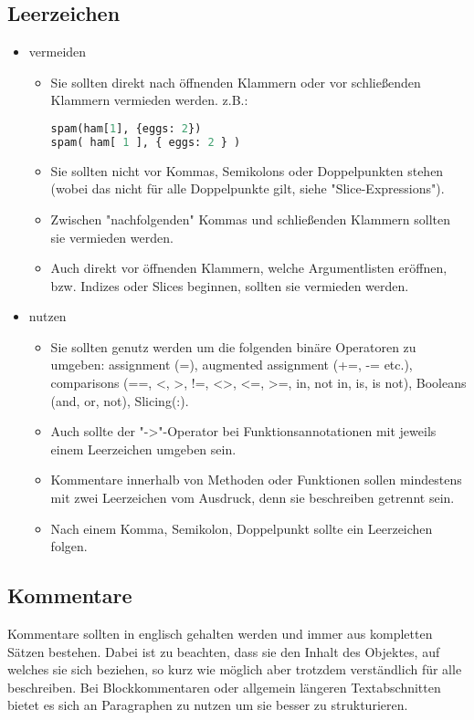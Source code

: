 \subsection{Leerzeichen}
\begin{itemize}
\item vermeiden
\begin{itemize}
\item Sie sollten direkt nach öffnenden Klammern oder vor schließenden Klammern vermieden werden.
z.B.: 
\begin{lstlisting}[language=python]
spam(ham[1], {eggs: 2})
spam( ham[ 1 ], { eggs: 2 } )
\end{lstlisting}
\item Sie sollten nicht vor Kommas, Semikolons oder Doppelpunkten stehen (wobei das nicht für alle Doppelpunkte gilt, siehe "Slice-Expressions").
\item Zwischen "nachfolgenden" Kommas und schließenden Klammern sollten sie vermieden werden.
\item Auch direkt vor öffnenden Klammern, welche Argumentlisten eröffnen, bzw. Indizes oder Slices beginnen, sollten sie vermieden werden.
\end{itemize}
\item nutzen
\begin{itemize}
\item Sie sollten genutz werden um die folgenden binäre Operatoren zu umgeben: assignment (=), augmented assignment (+=, -= etc.), comparisons (==, <, >, !=, <>, <=, >=, in, not in, is, is not), Booleans (and, or, not), Slicing(:).
\item Auch sollte der "->"-Operator bei Funktionsannotationen mit jeweils einem Leerzeichen umgeben sein.
\item Kommentare innerhalb von Methoden oder Funktionen sollen mindestens mit zwei Leerzeichen vom Ausdruck, denn sie beschreiben getrennt sein.
\item Nach einem Komma, Semikolon, Doppelpunkt sollte ein Leerzeichen folgen.
\end{itemize}
\end{itemize}

\subsection{Kommentare}
Kommentare sollten in englisch gehalten werden und immer aus kompletten Sätzen bestehen. Dabei ist zu beachten, dass sie den Inhalt des Objektes, auf welches sie sich beziehen, so kurz wie möglich aber trotzdem verständlich für alle beschreiben. Bei Blockkommentaren oder allgemein längeren Textabschnitten bietet es sich an Paragraphen zu nutzen um sie besser zu strukturieren.

